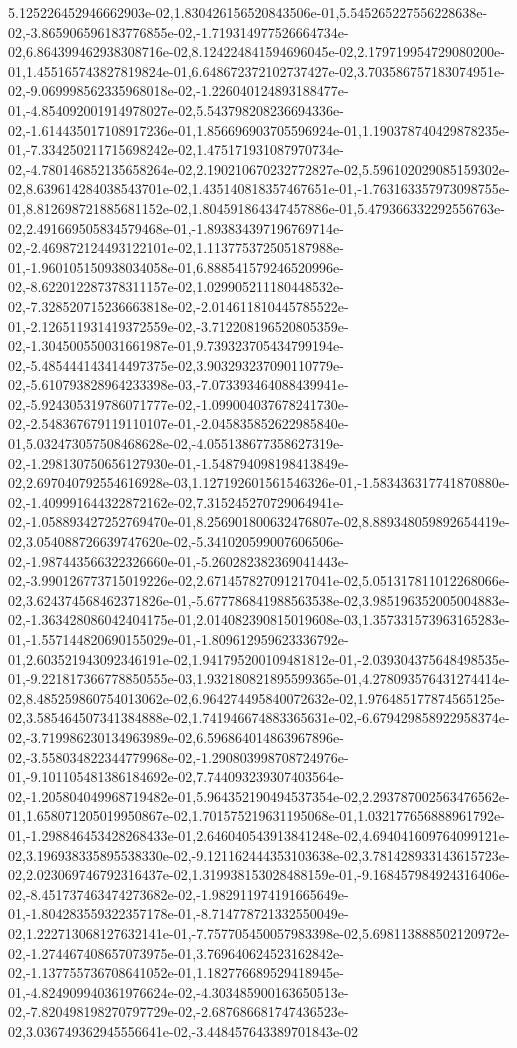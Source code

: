 5.125226452946662903e-02,1.830426156520843506e-01,5.545265227556228638e-02,-3.865906596183776855e-02,-1.719314977526664734e-02,6.864399462938308716e-02,8.124224841594696045e-02,2.179719954729080200e-01,1.455165743827819824e-01,6.648672372102737427e-02,3.703586757183074951e-02,-9.069998562335968018e-02,-1.226040124893188477e-01,-4.854092001914978027e-02,5.543798208236694336e-02,-1.614435017108917236e-01,1.856696903705596924e-01,1.190378740429878235e-01,-7.334250211715698242e-02,1.475171931087970734e-02,-4.780146852135658264e-02,2.190210670232772827e-02,5.596102029085159302e-02,8.639614284038543701e-02,1.435140818357467651e-01,-1.763163357973098755e-01,8.812698721885681152e-02,1.804591864347457886e-01,5.479366332292556763e-02,2.491669505834579468e-01,-1.893834397196769714e-02,-2.469872124493122101e-02,1.113775372505187988e-01,-1.960105150938034058e-01,6.888541579246520996e-02,-8.622012287378311157e-02,1.029905211180448532e-02,-7.328520715236663818e-02,-2.014611810445785522e-01,-2.126511931419372559e-02,-3.712208196520805359e-02,-1.304500550031661987e-01,9.739323705434799194e-02,-5.485444143414497375e-02,3.903293237090110779e-02,-5.610793828964233398e-03,-7.073393464088439941e-02,-5.924305319786071777e-02,-1.099004037678241730e-02,-2.548367679119110107e-01,-2.045835852622985840e-01,5.032473057508468628e-02,-4.055138677358627319e-02,-1.298130750656127930e-01,-1.548794098198413849e-02,2.697040792554616928e-03,1.127192601561546326e-01,-1.583436317741870880e-02,-1.409991644322872162e-02,7.315245270729064941e-02,-1.058893427252769470e-01,8.256901800632476807e-02,8.889348059892654419e-02,3.054088726639747620e-02,-5.341020599007606506e-02,-1.987443566322326660e-01,-5.260282382369041443e-02,-3.990126773715019226e-02,2.671457827091217041e-02,5.051317811012268066e-02,3.624374568462371826e-01,-5.677786841988563538e-02,3.985196352005004883e-02,-1.363428086042404175e-01,2.014082390815019608e-03,1.357331573963165283e-01,-1.557144820690155029e-01,-1.809612959623336792e-01,2.603521943092346191e-02,1.941795200109481812e-01,-2.039304375648498535e-01,-9.221817366778850555e-03,1.932180821895599365e-01,4.278093576431274414e-02,8.485259860754013062e-02,6.964274495840072632e-02,1.976485177874565125e-02,3.585464507341384888e-02,1.741946674883365631e-02,-6.679429858922958374e-02,-3.719986230134963989e-02,6.596864014863967896e-02,-3.558034822344779968e-02,-1.290803998708724976e-01,-9.101105481386184692e-02,7.744093239307403564e-02,-1.205804049968719482e-01,5.964352190494537354e-02,2.293787002563476562e-01,1.658071205019950867e-02,1.701575219631195068e-01,1.032177656888961792e-01,-1.298846453428268433e-01,2.646040543913841248e-02,4.694041609764099121e-02,3.196938335895538330e-02,-9.121162444353103638e-02,3.781428933143615723e-02,2.023069746792316437e-02,1.319938153028488159e-01,-9.168457984924316406e-02,-8.451737463474273682e-02,-1.982911974191665649e-01,-1.804283559322357178e-01,-8.714778721332550049e-02,1.222713068127632141e-01,-7.757705450057983398e-02,5.698113888502120972e-02,-1.274467408657073975e-01,3.769640624523162842e-02,-1.137755736708641052e-01,1.182776689529418945e-01,-4.824909940361976624e-02,-4.303485900163650513e-02,-7.820498198270797729e-02,-2.687686681747436523e-02,3.036749362945556641e-02,-3.448457643389701843e-02
